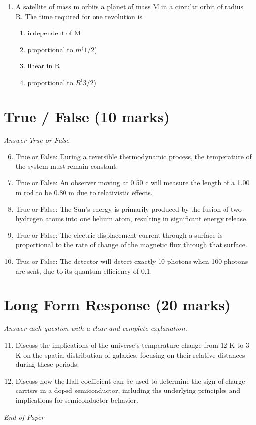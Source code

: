 \documentclass[12pt]{article}
\begin{document}
\begin{enumerate}[label=\arabic*.]
\begin{enumerate}[label=(\alph*)]
    \item 5
    \item 6
    \item 20
\end{enumerate}
\item A satellite of mass m orbits a planet of mass M in a circular orbit of radius R. The time required for one revolution is
\begin{enumerate}[label=(\alph*)]
    \item independent of M
    \item proportional to $m^(1$/2)
    \item linear in R
    \item proportional to $R^(3$/2)
\end{enumerate}
\end{enumerate}

\section*{True / False (10 marks)}
\textit{Answer True or False}
\begin{enumerate}[label=\arabic*.]
\setcounter{enumi}{5}
\item True or False: During a reversible thermodynamic process, the temperature of the system must remain constant.
\item True or False: An observer moving at 0.50 c will measure the length of a 1.00 m rod to be 0.80 m due to relativistic effects.
\item True or False: The Sun's energy is primarily produced by the fusion of two hydrogen atoms into one helium atom, resulting in significant energy release.
\item True or False: The electric displacement current through a surface is proportional to the rate of change of the magnetic flux through that surface.
\item True or False: The detector will detect exactly 10 photons when 100 photons are sent, due to its quantum efficiency of 0.1.
\end{enumerate}

\section*{Long Form Response (20 marks)}
\textit{Answer each question with a clear and complete explanation.}
\begin{enumerate}[label=\arabic*.]
\setcounter{enumi}{10}
\item Discuss the implications of the universe's temperature change from 12 K to 3 K on the spatial distribution of galaxies, focusing on their relative distances during these periods.
\item Discuss how the Hall coefficient can be used to determine the sign of charge carriers in a doped semiconductor, including the underlying principles and implications for semiconductor behavior.
\end{enumerate}

\vfill
\noindent\textit{End of Paper}
\end{document}
